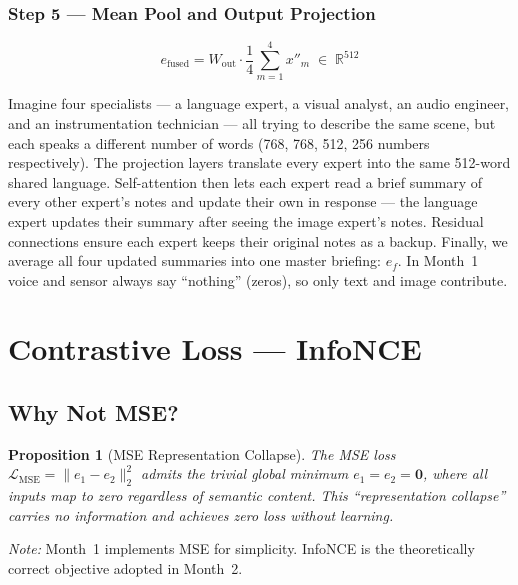 \documentclass[12pt, a4paper]{article}
\theoremstyle{definition}
\theoremstyle{plain}
\newtheorem{proposition}{Proposition}[section]
\theoremstyle{remark}
\begin{document}
\subsubsection{Step 5 --- Mean Pool and Output Projection}

\[
  e_{\mathrm{fused}} = W_{\mathrm{out}}\cdot
  \frac{1}{4}\sum_{m=1}^{4}x''_m \;\in\; \mathbb{R}^{512}
\]

\begin{tcolorbox}[layman]
Imagine four specialists --- a language expert, a visual analyst, an audio
engineer, and an instrumentation technician --- all trying to describe the
same scene, but each speaks a different number of words (768, 768, 512,
256 numbers respectively).  The projection layers translate every expert
into the same 512-word shared language.  Self-attention then lets each
expert read a brief summary of every other expert's notes and update
their own in response --- the language expert updates their summary after
seeing the image expert's notes.  Residual connections ensure each expert
keeps their original notes as a backup.  Finally, we average all four
updated summaries into one master briefing: $e_f$.  In Month~1 voice and
sensor always say ``nothing'' (zeros), so only text and image contribute.
\end{tcolorbox}

\section{Contrastive Loss --- InfoNCE}
\label{sec:infonce}

\subsection{Why Not MSE?}

\begin{proposition}[MSE Representation Collapse]
The MSE loss $\mathcal{L}_{\mathrm{MSE}} = \|e_1 - e_2\|_2^2$ admits the
trivial global minimum $e_1 = e_2 = \mathbf{0}$, where all inputs map to
zero regardless of semantic content.  This ``representation collapse'' carries
no information and achieves zero loss without learning.
\end{proposition}

\textit{Note:} Month~1 implements MSE for simplicity.  InfoNCE is the
theoretically correct objective adopted in Month~2.
\end{document}

